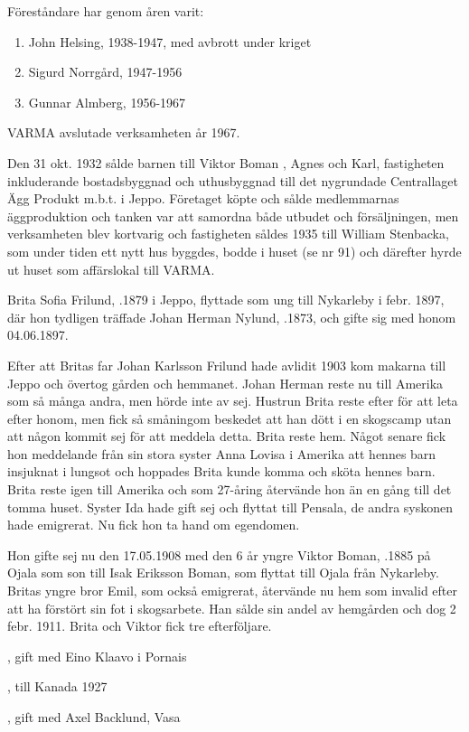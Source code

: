 Föreståndare har genom åren varit:
\begin{enumerate}
  \item John Helsing, 1938-1947, med avbrott under kriget
  \item Sigurd Norrgård, 1947-1956
  \item Gunnar Almberg, 1956-1967
\end{enumerate}

VARMA avslutade verksamheten år 1967.


Den 31 okt. 1932 sålde barnen till Viktor Boman , Agnes och Karl, fastigheten inkluderande bostadsbyggnad och uthusbyggnad till det nygrundade Centrallaget Ägg Produkt m.b.t. i Jeppo. Företaget köpte och sålde medlemmarnas äggproduktion och tanken var att samordna både utbudet och försäljningen, men verksamheten blev kortvarig och fastigheten såldes 1935 till William Stenbacka, som under tiden ett nytt hus byggdes, bodde i huset (se nr 91) och därefter hyrde ut huset som affärslokal till VARMA.


Brita Sofia Frilund, .1879 i Jeppo, flyttade som ung  till Nykarleby i febr. 1897, där hon tydligen träffade Johan Herman Nylund, .1873, och gifte sig med honom 04.06.1897.

Efter att Britas far Johan Karlsson Frilund hade avlidit 1903 kom makarna till Jeppo och övertog gården och hemmanet. Johan Herman reste nu till Amerika som så många andra, men hörde inte av sej. Hustrun Brita reste efter för att leta efter honom, men fick så  småningom beskedet att han dött i en skogscamp utan att någon kommit sej för att meddela detta. Brita reste hem. Något senare fick hon meddelande från sin stora syster Anna Lovisa i Amerika att hennes barn insjuknat i lungsot och hoppades Brita kunde komma och sköta hennes barn. Brita reste igen till Amerika och som 27-åring återvände hon än en gång till det tomma huset. Syster Ida hade gift sej och flyttat till Pensala, de andra syskonen hade emigrerat. Nu fick hon ta hand om egendomen.


Hon gifte sej nu den 17.05.1908 med den 6 år yngre Viktor Boman, .1885 på Ojala som son till Isak Eriksson Boman, som flyttat till Ojala från Nykarleby. Britas yngre bror Emil, som också emigrerat, återvände nu hem som invalid efter att ha förstört sin fot i skogsarbete. Han sålde sin andel av hemgården och dog 2 febr. 1911. Brita och Viktor fick tre efterföljare.
\begin{jhchildren}
  \item {}, gift med Eino Klaavo i Pornais
  \item {}, till Kanada 1927
  \item {}, gift med Axel Backlund, Vasa
\end{jhchildren}

